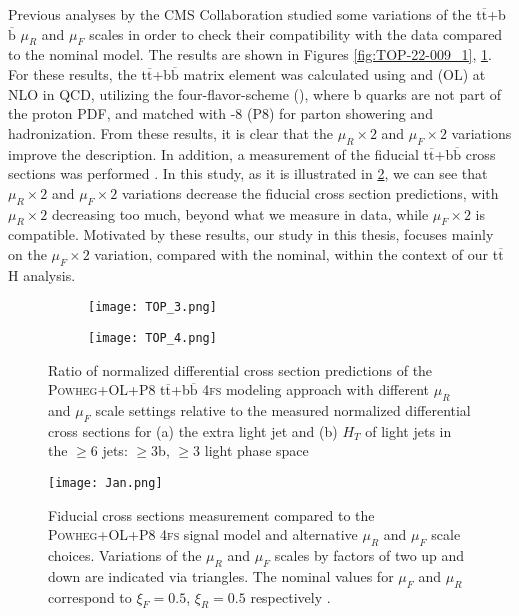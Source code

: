\noindent Previous analyses by the CMS Collaboration \cite{TOP-22-009} studied some variations of the t$\overline{\text{t}}$+b$\overline{\text{b}}$ $\mu_R$ and $\mu_F$ scales in order to check their compatibility with the data compared to the nominal model. The results are shown in Figures \ref{fig:TOP-22-009_1}, \ref{fig:TOP-22-009_2}. For these results, the t$\overline{\text{t}}$+b$\overline{\text{b}}$ matrix element was calculated using {\selectfont{Powheg}} and {\selectfont{OpenLoops}} (OL) at NLO in QCD, utilizing the four-flavor-scheme ({\selectfont{4fs}}), where b quarks are not part of the proton PDF, and matched with {\selectfont{Pythia}}-8 (P8) for parton showering and hadronization. From these results, it is clear that the $\mu_R\times2$ and $\mu_F\times2$ variations improve the description. In addition, a measurement of the fiducial t$\overline{\text{t}}$+b$\overline{\text{b}}$ cross sections was performed \cite{vanderLinden}. In this study, as it is illustrated in \ref{fig:vanderLinden}, we can see that $\mu_R\times2$ and $\mu_F\times2$ variations decrease the fiducial cross section predictions, with $\mu_R\times2$ decreasing too much, beyond what we measure in data, while $\mu_F\times2$ is compatible. Motivated by these results, our study in this thesis, focuses mainly on the $\mu_F\times2$ variation, compared with the nominal, within the context of our t$\overline{\text{t}}$H analysis.
\begin{figure}[H]
    \centering
    \begin{subfigure}{0.49\textwidth}
        \texttt{[image: TOP\_3.png]}
    \end{subfigure}
    \begin{subfigure}{0.49\textwidth}
        \texttt{[image: TOP\_4.png]}
    \end{subfigure}
    \caption{Ratio of normalized differential cross section predictions of the \textsc{Powheg}+OL+P8 t$\overline{\text{t}}$+b$\overline{\text{b}}$ \textsc{4fs} modeling approach with different $\mu_R$ and $\mu_F$ scale settings relative to the measured normalized differential cross sections for (a) the extra light jet and (b) $H_T$ of light jets in the $\geq$6 jets: $\geq$3b, $\geq$3 light phase space \cite{TOP-22-009}}
    \label{fig:TOP-22-009_2}
\end{figure}
\begin{figure}[H]
    \centering
    \texttt{[image: Jan.png]}
    \caption{Fiducial cross sections measurement compared to the \textsc{Powheg}+OL+P8 \textsc{4fs} signal model and alternative $\mu_R$ and $\mu_F$ scale choices. Variations of the $\mu_R$ and $\mu_F$ scales by factors of two up and down are indicated via triangles. The nominal values for $\mu_F$ and $\mu_R$ correspond to $\xi_F = 0.5$, $\xi_R =0.5$ respectively \cite{vanderLinden}.}
    \label{fig:vanderLinden}
\end{figure}

